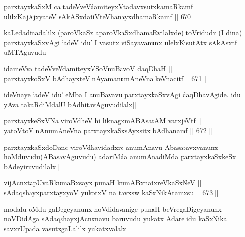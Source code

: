 \begin{shl}
parxtayxkaSxM ca tadeVveVdamiteyxVtadavxsutxkamaRkamf ||  \\
ulilxKajAjxyateV sAkASxdatiVteV\s hanayxdhamaRkamf ||  670 ||  
\end{shl}

\begin{artha}
kaLedadinadalilx (paroVkaSx aparoVkaSxdhamaRvilalxde) toVridudx (I dina) parxtayxkaSxvAgi `adeV idu' I vasutx viSayavanunx ulelxKisutAtx sAkAsxtf uMTAguvudu||
\end{artha}


\begin{shl}
idameVva tadeVveVdamiteyxVSoV\s nuBavoV daqDhaH || \\
parxtayxkoSxV bAdhayxteV nAyamanumAneVna keVnacitf ||  671 ||  
\end{shl}

\begin{artha}
ideVnaye `adeV idu' eMba I anuBavavu parxtayxkaSxvAgi daqDhavAgide. idu yAva takaRdiMdalU bAdhitavAguvudilalx||
\end{artha}


\begin{shl}
parxtayxkeSxVNa viroVdheV hi liknagxmABAsatAM varxjeVtf || \\
yatoV\s toV nAnumAneVna parxtayxkaSxsAyxsitx bAdhanamf ||  672 ||  
\end{shl}

\begin{artha}
parxtayxkaSxdoDane viroVdhavidadxre anumAnavu Abasatavxvanunx hoMduvudu(ABasavAguvudu) adariMda anumAnadiMda parxtayxkaSxkeSx bAdeyiruvudilalx||
\end{artha}


\begin{shl}
vijAcnxtapUvaRkumaBxsayx punaH kumABxnatxreVkaSxNeV || \\
sAdaqshayxparxtayxyoV yukotxV na tavxsw kaSxNikAtamxsu ||  673 ||  
\end{shl}

\begin{artha}
modalu oMdu gaDegeyanunx noVdidavanige punaH beVregaDigeyanunx noVDidAga sAdaqshayxjAcnxnavu baruvudu yukatx Adare idu kaSxNika savxrUpada vasutxgaLalilx yukatxvalalx||
\end{artha}

